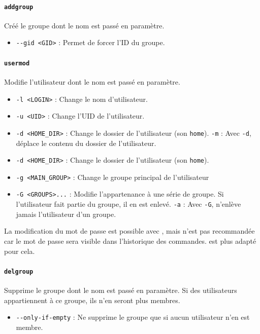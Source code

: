 \paragraph{\texttt{addgroup}} 
Créé le groupe dont le nom est passé en paramètre.
\begin{itemize}
    \item \texttt{-{}-gid <GID>} : Permet de forcer l'ID du groupe.
\end{itemize}\vspace{\baselineskip}


\paragraph{\texttt{usermod}} 
Modifie l'utilisateur dont le nom est passé en paramètre.
\begin{itemize}
    \item \texttt{-l <LOGIN>} : Change le nom d'utilisateur.
    \item \texttt{-u <UID>} : Change l'UID de l'utilisateur.
    \item \texttt{-d <HOME\_DIR>} : Change le dossier de l'utilisateur (son \texttt{home}). \newline
        \texttt{-m} : Avec \texttt{-d}, déplace le contenu du dossier de l'utilisateur.
    \item \texttt{-d <HOME\_DIR>} : Change le dossier de l'utilisateur (son \texttt{home}).
    \item \texttt{-g <MAIN\_GROUP>} : Change le groupe principal de l'utilisateur
    \item \texttt{-G <GROUPS>...} : Modifie l'appartenance à une série de groupe. Si l'utilisateur fait partie du groupe, il en est enlevé. \newline
        \texttt{-a} : Avec \texttt{-G}, n'enlève jamais l'utilisateur d'un groupe.
\end{itemize}
La modification du mot de passe est possible avec , mais n'est pas recommandée car le mot de passe sera visible dans l'historique des commandes.  est plus adapté pour cela.\vspace{\baselineskip}

\paragraph{\texttt{delgroup}} 
Supprime le groupe dont le nom est passé en paramètre. Si des utilisateurs appartiennent à ce groupe, ils n'en seront plus membres.
\begin{itemize}
    \item \texttt{-{}-only-if-empty} : Ne supprime le groupe que si aucun utilisateur n'en est membre.
\end{itemize}\vspace{\baselineskip}